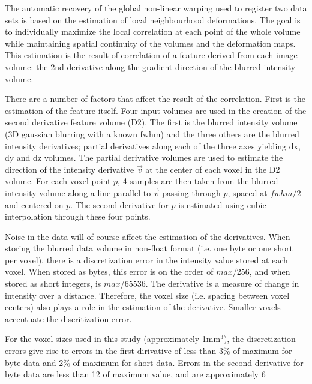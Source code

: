 



The automatic recovery of the global non-linear warping used to
register two data sets is based on the estimation of local
neighbourhood deformations.  The goal is to individually maximize the
local correlation at each point of the whole volume while maintaining
spatial continuity of the volumes and the deformation maps. This
estimation is the result of correlation of a feature derived from each
image volume: the 2nd derivative along the gradient direction of the
blurred intensity volume.

There are a number of factors that affect the result of the
correlation.  First is the estimation of the feature itself. Four
input volumes are used in the creation of the second derivative
feature volume (D2).  The first is the blurred intensity volume (3D
gaussian blurring with a known fwhm) and the three others are the
blurred intensity derivatives; partial derivatives along each of the
three axes yielding dx, dy and dz volumes.  The partial derivative
volumes are used to estimate the direction of the intensity derivative
$\vec{v}$ at the center of each voxel in the D2 volume.  For each
voxel point $p$, 4 samples are then taken from the blurred intensity
volume along a line parallel to $\vec{v}$ passing through $p$, spaced
at $fwhm/2$ and centered on $p$.  The second derivative for $p$ is
estimated using cubic interpolation through these four points.

% 
% 
%       
%       

Noise in the data will of course affect the estimation of the
derivatives. When storing the blurred data volume in non-float format
(i.e.  one byte or one short per voxel), there is a discretization
error in the intensity value stored at each voxel.  When stored as
bytes, this error is on the order of $max$/256, and when stored as
short integers, is $max$/65536.  The derivative is a measure of change
in intensity over a distance.  Therefore, the voxel size (i.e. spacing
between voxel centers) also plays a role in the estimation of the
derivative.   Smaller voxels accentuate the discritization error.

For the voxel sizes used in this study (approximately 1mm$^3$), the
discretization errors give rise to errors in the first dirivative of
less than 3\% of maximum for byte data and 2\% of maximum for short
data.  Errors in the second derivative for byte data are less than 12%
of maximum value, and are approximately 6%


